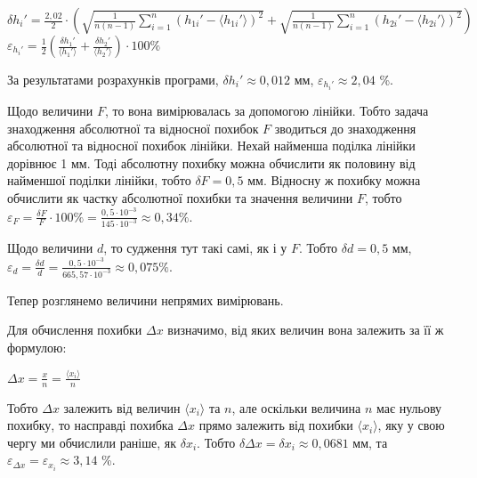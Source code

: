 \documentclass[12pt,a4paper]{article}
\begin{document}
    \begin{center}

        $\displaystyle \delta h_i' = \frac{2,02}{2} \cdot \left( \sqrt{\frac{1}{n(n-1)} \sum_{i=1}^n \left( h_{1i}' - \langle h_{1i}' \rangle \right)^2 } +
        \sqrt{\frac{1}{n(n-1)} \sum_{i=1}^n \left( h_{2i}' - \langle h_{2i}' \rangle \right)^2} \right)$ \\

        $\displaystyle \varepsilon_{h_i'} = \frac{1}{2} \left( \frac{\delta h_1'}{\langle h_1' \rangle} + \frac{\delta h_2'}{\langle h_2' \rangle} \right) \cdot 100\%$

    \end{center}

    За результатами розрахунків програми, $\delta h_i' \approx 0,012$ мм,  $\varepsilon_{h_i'} \approx 2,04$ \%.

    Щодо величини $F$, то вона вимірювалась за допомогою лінійки. Тобто задача знаходження абсолютної та відносної похибок $F$
    зводиться до знаходження абсолютної та відносної похибок лінійки. Нехай найменша поділка лінійки дорівнює 1 мм. Тоді абсолютну похибку
    можна обчислити як половину від найменшої поділки лінійки, тобто $\delta F = 0,5$ мм. Відносну ж похибку можна обчислити як частку
    абсолютної похибки та значення величини $F$, тобто $\displaystyle \varepsilon_F = \frac{\delta F}{F} \cdot 100\% = \frac{0,5\cdot 10^{-3}}{145 \cdot 10^{-3}} \approx 0,34 \%$.

    Щодо величини $d$, то судження тут такі самі, як і у $F$. Тобто $\delta d = 0,5$ мм, $\displaystyle \varepsilon_d = \frac{\delta d}{d} = \frac{0,5 \cdot 10^{-3}}{665,57 \cdot 10^{-3}} \approx 0,075 \%$.

    Тепер розглянемо величини непрямих вимірювань.

    Для обчислення похибки $\Delta x$ визначимо, від яких величин вона залежить за її ж формулою:

    \begin{center}
        $\displaystyle \Delta x = \frac{x}{n} = \frac{\langle x_i \rangle}{n}$
    \end{center}

    \newpage

    Тобто $\Delta x$ залежить від величин $\langle x_i \rangle$ та $n$, але оскільки величина $n$ має нульову похибку, то насправді похибка $\Delta x$ прямо залежить від похибки $\langle x_i \rangle$, яку у свою чергу
    ми обчислили раніше, як $\delta x_i$. Тобто $\delta \Delta x = \delta x_i \approx 0,0681$ мм, та $\varepsilon_{\Delta x} = \varepsilon_{x_i} \approx 3,14$ \%.
\end{document}
